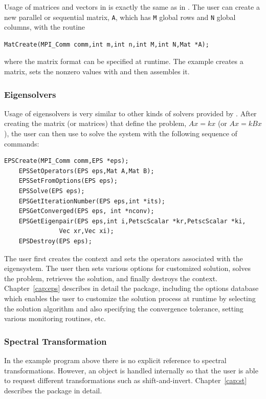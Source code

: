 Usage of matrices and vectors in \slepc is exactly the same as in \petsc.
The user can create a new parallel or sequential matrix, \texttt{A}, which
has \texttt{M} global rows and \texttt{N} global columns, with the routine
	\begin{Verbatim}[fontsize=\small]
	MatCreate(MPI_Comm comm,int m,int n,int M,int N,Mat *A);
	\end{Verbatim}
where the matrix format can be specified at runtime. The example creates a matrix, sets the nonzero values with  and then assembles it.

\subsubsection*{Eigensolvers}

Usage of eigensolvers is very similar to other kinds of solvers provided by \petsc.
After creating the matrix (or matrices) that define the problem,
$Ax = kx$ (or $Ax=kBx$), the user can then use  to solve the system 
with the following sequence of commands: 
 
  
	\begin{Verbatim}[fontsize=\small,numbers=none]
	EPSCreate(MPI_Comm comm,EPS *eps);
	EPSSetOperators(EPS eps,Mat A,Mat B);
	EPSSetFromOptions(EPS eps);
	EPSSolve(EPS eps);
	EPSGetIterationNumber(EPS eps,int *its);
	EPSGetConverged(EPS eps, int *nconv);
	EPSGetEigenpair(EPS eps,int i,PetscScalar *kr,PetscScalar *ki,
               Vec xr,Vec xi);
	EPSDestroy(EPS eps);
	\end{Verbatim}
The user first creates the  context and sets the operators
associated with the eigensystem. The user then sets various options for
customized solution, solves the problem, retrieves the solution, 
and finally destroys the  context.
Chapter~\ref{cap:eps} describes in detail the  package, including
the options database which enables the user to customize the solution
process at runtime by selecting the solution algorithm and also specifying the convergence tolerance, setting various monitoring routines, etc.

\subsubsection*{Spectral Transformation}

In the example program above there is no explicit reference to spectral transformations. However, an  object is handled internally so that the user is able to request different transformations such as shift-and-invert.
Chapter~\ref{cap:st} describes the  package in detail.

